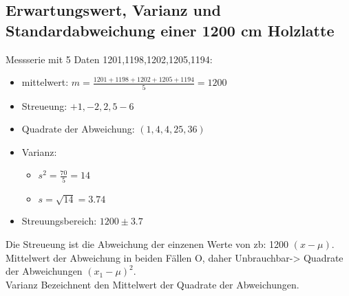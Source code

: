 \subsection{Erwartungswert, Varianz und Standardabweichung einer 1200 cm Holzlatte }

Messserie mit 5 Daten 1201,1198,1202,1205,1194:\\
\begin{itemize}
    \item mittelwert: $m=\frac{1201+1198+1202+1205+1194}{5} = 1200$
    \item Streueung: $+1,-2,2,5-6$
    \item Quadrate der Abweichung: $(1,4,4,25,36)$
    \item Varianz:\begin{itemize}
        \item $s^2=\frac{70}{5} = 14$
        \item $s = \sqrt{14} = 3.74$
    \end{itemize}
    \item Streuungsbereich: $1200 \pm 3.7$
\end{itemize}

Die Streueung ist die Abweichung der einzenen Werte von zb: 1200 $(x-\mu)$.\\
Mittelwert der Abweichung in beiden Fällen O, daher Unbrauchbar-> Quadrate der Abweichungen $(x_1 -\mu)^2$.\\
Varianz Bezeichnent den Mittelwert der Quadrate der Abweichungen. 
